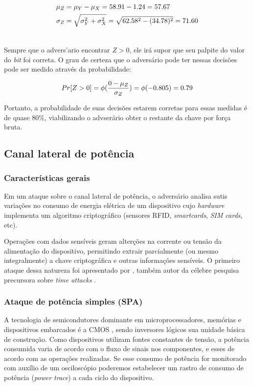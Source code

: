 \begin{align}\notag
    \mu_{Z} &= \mu_{Y} - \mu_{X} = 58.91 - 1.24 = 57.67\\\notag
    \sigma_{Z} &= \sqrt{ \sigma_{Y}^{2} + \sigma_{X}^{2}} = \sqrt{ 62.58^{2} - (34.78)^{2}} = 71.60\\ \notag
\end{align}

Sempre que o advers'{a}rio encontrar $Z > 0$, ele ir\'{a} supor que seu palpite do valor do \textit{bit} foi correta. O grau de certeza que o advers\'{a}rio pode ter nessas decis\~{o}es pode ser medido atrav\'{e}s da probabilidade:

\begin{align}
    Pr[Z > 0] = \phi(\dfrac{0 - \mu_{Z}}{\sigma_{Z}}) = \phi(-0.805) = 0.79\notag
\end{align}

Portanto, a probabilidade de suas decis\~{o}es estarem corretas para essas medidas \'{e} de quase 80\%, viabilizando o advser\'{a}rio obter o restante da chave por for\c{c}a bruta.

\subsection{Canal lateral de potência}

\subsubsection{Características gerais}
Em um ataque sobre o canal lateral de pot\^{e}ncia, o advers\'{a}rio analisa sutis varia\c{c}\~{o}es no consumo de energia el\'{e}trica de um dispositivo cujo \textit{hardware} implementa um algoritmo criptogr\'{a}fico (sensores RFID, \textit{smartcards}, \textit{SIM cards}, etc).

Opera\c{c}\~{o}es com dados sens\'{i}veis geram alter\c{c}\~{o}es na corrente ou tens\~{a}o da alimenta\c{c}\~{a}o do dispositivo, permitindo extrair parcialmente (ou mesmo integralmente) a chave criptogr\'{a}fica e outras informa\c{c}\~{o}es  sens\'{i}veis. O primeiro ataque dessa natureza foi apresentado por \cite{Kocher:1999:DPA:646764.703989}, tamb\'{e}m autor da c\'{e}lebre pesquisa precursora sobre \textit{time attacks} \cite{Kocher96}. 

\subsubsection{Ataque de potência simples (SPA)}
A tecnologia de semicondutores dominante em microprocessadores, mem\'{o}rias e dispositivos embarcados \'{e} a CMOS   \cite{sedra:1997}, sendo inversores l\'{o}gicos sua unidade b\'{a}sica de constru\c{c}\~{a}o. Como dispositivos utilizam fontes constantes de tens\~{a}o, a pot\^{e}ncia consumida varia de acordo com o fluxo de sinais nos componentes, e esses de acordo com as opera\c{c}\~{o}es realizadas. Se esse consumo de pot\^{e}ncia for monitorado com aux\'{i}lio de um oscilosc\'{o}pio poderemos estabelecer um rastro de consumo de pot\^{e}ncia (\textit{power trace}) a cada ciclo do dispositivo.

